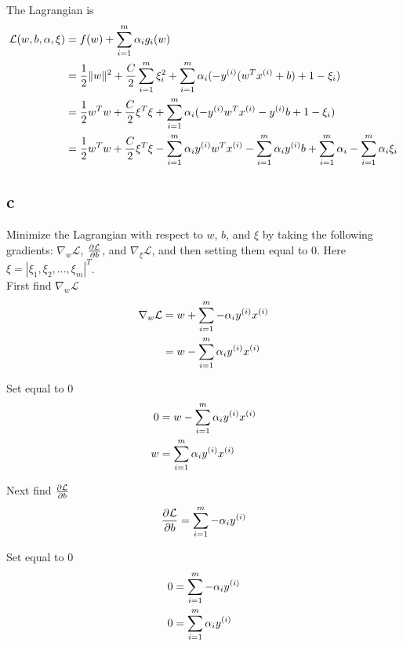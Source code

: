 \documentclass[11pt]{article}
\begin{document}
The Lagrangian is
\begin{align*}
  \mathcal{L}(w,b,\alpha,\xi) &= f(w) + \sum_{i=1}^{m} \alpha_i g_i(w) \\
  &= \frac{1}{2} \|w\|^2 + \frac{C}{2} \sum_{i=1}^{m} \xi_i^2 + \sum_{i=1}^{m} \alpha_i (-y^{(i)} (w^T x^{(i)} + b) + 1 - \xi_i) \\
  &= \frac{1}{2} w^T w + \frac{C}{2} \xi^T \xi + \sum_{i=1}^{m} \alpha_i (-y^{(i)} w^T x^{(i)} - y^{(i)} b + 1 - \xi_i) \\
  &= \frac{1}{2} w^T w + \frac{C}{2} \xi^T \xi - \sum_{i=1}^{m} \alpha_i y^{(i)} w^T x^{(i)} - \sum_{i=1}^{m} \alpha_i y^{(i)} b + \sum_{i=1}^{m} \alpha_i - \sum_{i=1}^{m} \alpha_i \xi_i \\
\end{align*}

\subsection*{c}

Minimize the Lagrangian with respect to $w$, $b$, and $\xi$ by taking the following gradients: $\nabla_w \mathcal{L}$, $\frac{\partial\mathcal{L}}{\partial b}$, and $\nabla_{\xi} \mathcal{L}$, and then setting them equal to $0$. Here $\xi = |\xi_1,\xi_2,...,\xi_m|^{T}$. \\

First find $\nabla_w \mathcal{L}$
\begin{align*}
  \nabla_w \mathcal{L} &= w + \sum_{i=1}^{m} -\alpha_i y^{(i)} x^{(i)} \\
                       &= w - \sum_{i=1}^{m} \alpha_i y^{(i)} x^{(i)} \\
\end{align*}

Set equal to 0
\begin{align*}
                     0 &= w - \sum_{i=1}^{m} \alpha_i y^{(i)} x^{(i)} \\
                     w &= \sum_{i=1}^{m} \alpha_i y^{(i)} x^{(i)} \\
\end{align*}

Next find $\frac{\partial\mathcal{L}}{\partial b}$
\begin{align*}
  \frac{\partial\mathcal{L}}{\partial b} &= \sum_{i=1}^{m} -\alpha_i y^{(i)} \\
\end{align*}

Set equal to 0
\begin{align*}
  0 &= \sum_{i=1}^{m} -\alpha_i y^{(i)} \\
  0 &= \sum_{i=1}^{m} \alpha_i y^{(i)} \\
\end{align*}
\end{document}
